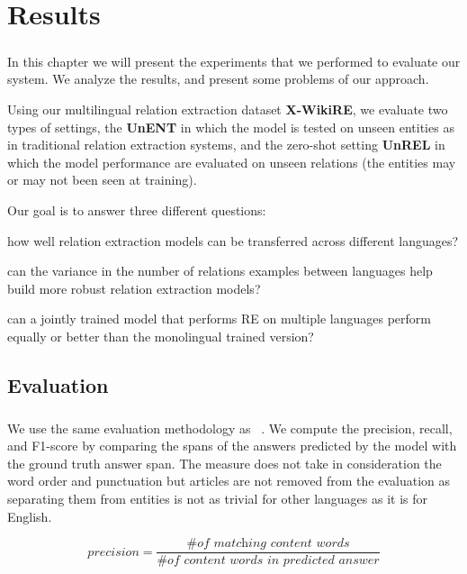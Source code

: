 \chapter{Results}
\label{chpt:6}
\paragraph{}
In this chapter we will present the experiments that we performed to evaluate our system. We analyze the results, and present some problems of our approach.


Using our multilingual relation extraction dataset \textbf{X-WikiRE}, we evaluate two types of settings, the \textbf{UnENT} in which the model is tested on unseen entities as in traditional relation extraction systems, and the zero-shot setting \textbf{UnREL} in which the model performance are evaluated on unseen relations (the entities may or may not been seen at training).

Our goal is to answer three different questions: \begin{enumerate*}[a) , font=\bfseries]
    \item how well relation extraction models can be transferred across different languages?
    \item can the variance in the number of relations examples between languages help  build more robust relation extraction models?
    \item can a jointly trained model that performs RE on multiple languages perform equally or better than the monolingual trained version?
\end{enumerate*}


\section{Evaluation}
\paragraph{}
We use the same evaluation methodology as ~\cite{levy2017zero}. We compute the precision, recall, and F1-score by comparing the spans of the answers predicted by the model with the ground truth answer span. The measure does not take in consideration the word order and punctuation but articles are not removed from the evaluation as separating them from entities is not as trivial for other languages as it is for English.

\begin{equation}
    precision = \frac{\textit{\# of matching content words}}{\textit{\# of content words in predicted answer}}
\label{eq:precision}
\end{equation}



